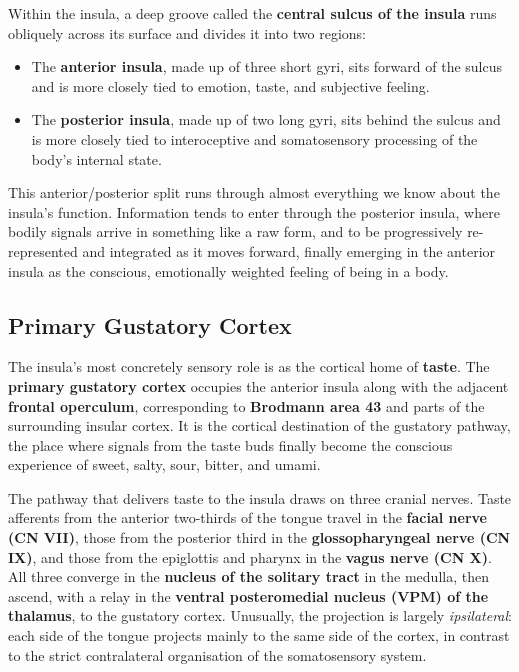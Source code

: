 \documentclass[11pt]{article}
\begin{document}
Within the insula, a deep groove called the \textbf{central sulcus of the insula} runs obliquely across its surface and divides it into two regions:

\begin{itemize}
    \item The \textbf{anterior insula}, made up of three short gyri, sits forward of the sulcus and is more closely tied to emotion, taste, and subjective feeling.
    \item The \textbf{posterior insula}, made up of two long gyri, sits behind the sulcus and is more closely tied to interoceptive and somatosensory processing of the body's internal state.
\end{itemize}

This anterior/posterior split runs through almost everything we know about the insula's function. Information tends to enter through the posterior insula, where bodily signals arrive in something like a raw form, and to be progressively re-represented and integrated as it moves forward, finally emerging in the anterior insula as the conscious, emotionally weighted feeling of being in a body.

\subsection{Primary Gustatory Cortex}

The insula's most concretely sensory role is as the cortical home of \textbf{taste}. The \textbf{primary gustatory cortex} occupies the anterior insula along with the adjacent \textbf{frontal operculum}, corresponding to \textbf{Brodmann area 43} and parts of the surrounding insular cortex. It is the cortical destination of the gustatory pathway, the place where signals from the taste buds finally become the conscious experience of sweet, salty, sour, bitter, and umami.

The pathway that delivers taste to the insula draws on three cranial nerves. Taste afferents from the anterior two-thirds of the tongue travel in the \textbf{facial nerve (CN VII)}, those from the posterior third in the \textbf{glossopharyngeal nerve (CN IX)}, and those from the epiglottis and pharynx in the \textbf{vagus nerve (CN X)}. All three converge in the \textbf{nucleus of the solitary tract} in the medulla, then ascend, with a relay in the \textbf{ventral posteromedial nucleus (VPM) of the thalamus}, to the gustatory cortex. Unusually, the projection is largely \textit{ipsilateral}: each side of the tongue projects mainly to the same side of the cortex, in contrast to the strict contralateral organisation of the somatosensory system.
\end{document}
